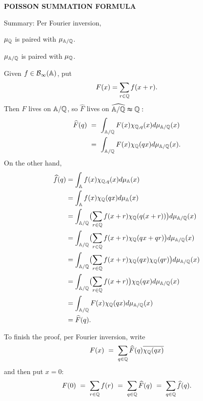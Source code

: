 \begin{x}{\small\bf POISSON SUMMATION FORMULA}
\vspace{0.2cm}

Summary: Per Fourier inversion,

\qquad \textbullet \quad $\mu_{\mathbb{Q}}$ is paired with $\mu_{\mathbb{A}/\mathbb{Q}}$. 

\qquad \textbullet \quad $\mu_{\mathbb{A}/\mathbb{Q}}$ is paired with $\mu_{\mathbb{Q}}$.
\vspace{0.2cm}

Given $f \in \mathcal{B}_\infty(\mathbb{A})$, put
\[
F(x) = \sum_{r \in \mathbb{Q}} f(x+r).
\]
Then $F$ lives on $\mathbb{A}/\mathbb{Q}$, so $\widehat{F}$ lives on $\widehat{\mathbb{A}/\mathbb{Q}} \thickapprox \mathbb{Q}:$
\begin{align*}
\widehat{F}(q) \ 
&=\  \int_{\A/\Q} F(x) \chi_{\Q, q}(x) d\mu_{\A/\Q}(x) \\
&=\  \int_{\A/\Q} F(x) \chi_\Q(qx) d\mu_{\A/\Q}(x).
\end{align*}
On the other hand,
\begin{align*}
\widehat{f}(q)  	
&= \int_{\mathbb{A}} f(x) \chi_{\mathbb{Q}, q}(x) d\mu_{\mathbb{A}}(x) \\
&= \int_{\mathbb{A}} f(x) \chi_{\mathbb{Q}} (qx) d\mu_{\mathbb{A}}(x) \\
&= \int_{\mathbb{A}/\mathbb{Q}} \bigl(\sum_{r \in \mathbb{Q}} f(x+r)  \chi_{\mathbb{Q}} (q(x+r))\bigr) d\mu_{\mathbb{A}/\mathbb{Q}} (x) \\
&= \int_{\mathbb{A}/\mathbb{Q}} \bigl(\sum_{r \in \mathbb{Q}} f(x+r)  \chi_{\mathbb{Q}} (qx+qr)\bigr) d\mu_{\mathbb{A}/\mathbb{Q}} (x) \\
&= \int_{\mathbb{A}/\mathbb{Q}} \bigl(\sum_{r \in \mathbb{Q}} f(x+r)  \chi_{\mathbb{Q}} (qx) \chi_{\mathbb{Q}} (qr)  \bigr) d\mu_{\mathbb{A}/\mathbb{Q}} (x) \\
&= \int_{\mathbb{A}/\mathbb{Q}} \bigl(\sum_{r \in \mathbb{Q}} f(x+r)\bigr)  \chi_{\mathbb{Q}} (qx)   d\mu_{\mathbb{A}/\mathbb{Q}} (x) \\
&= \int_{\mathbb{A}/\mathbb{Q}} F(x)  \chi_{\mathbb{Q}} (qx)   d\mu_{\mathbb{A}/\mathbb{Q}} (x) \\
&= \widehat{F}(q).
\end{align*}

To finish the proof, per Fourier inversion, write
\[
F(x) \ =\  \sum_{q \in \mathbb{Q}} \widehat{F}(q) \overline{\chi_{\mathbb{Q}}(qx)}
\]
and then put $x = 0$:
\[
F(0) \ =\  \sum_{r \in \Q} f(r) \ =\  \sum_{q \in \Q} \widehat{F}(q) \ =\  \sum_{q \in \Q} \widehat{f}(q).
\]
\end{x}

\vspace{0.1cm}


